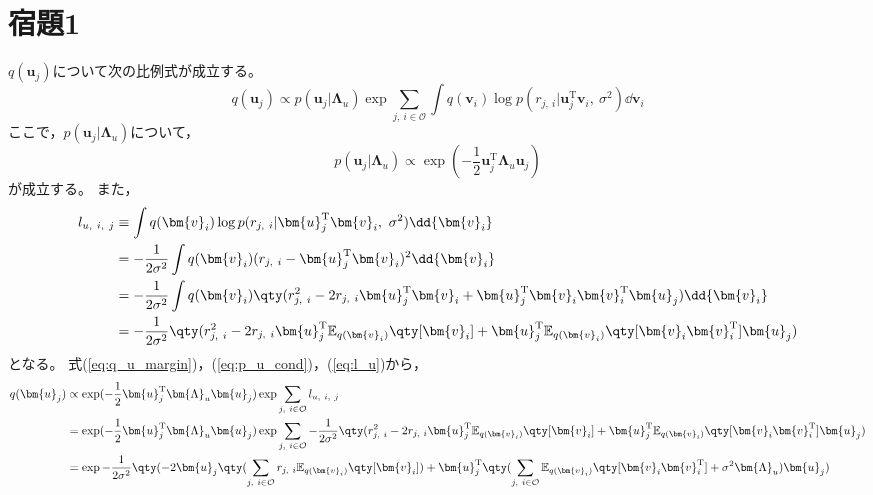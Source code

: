 \documentclass[class=jsarticle, crop=false, dvipdfmx, fleqn]{standalone}
\begin{document}
\section*{宿題1}

\(q(\bm{u}_j)\)について次の比例式が成立する。
\begin{equation}
    q(\bm{u}_j) \propto p(\bm{u}_j | \bm{\Lambda}_u) \exp{\sum_{j,\ i \in \mathcal{O}} \int q(\bm{v}_i) \log{p(r_{j,\ i} | \bm{u}_j^\mathrm{T} \bm{v}_i,\ \sigma^2)} \dd{\bm{v}_i}}
    \label{eq:q_u_margin}
\end{equation}
ここで，\(p(\bm{u}_j | \bm{\Lambda}_u)\)について，
\begin{equation}
    p(\bm{u}_j | \bm{\Lambda}_u) \propto \exp(- \frac{1}{2} \bm{u}_j^\mathrm{T} \bm{\Lambda}_u \bm{u}_j)
    \label{eq:p_u_cond}
\end{equation}
が成立する。
また，
\begin{align}
    l_{u,\ i,\ j}
        & \equiv \int q(\bm{v}_i) \log{p(r_{j,\ i} | \bm{u}_j^\mathrm{T} \bm{v}_i,\ \sigma^2)} \dd{\bm{v}_i} \\
        & = - \frac{1}{2 \sigma^2} \int q(\bm{v}_i) (r_{j,\ i} - \bm{u}_j^\mathrm{T} \bm{v}_i)^2 \dd{\bm{v}_i} \notag \\
        & = - \frac{1}{2 \sigma^2} \int q(\bm{v}_i) \qty(r_{j,\ i}^2 - 2 r_{j,\ i} \bm{u}_j^\mathrm{T} \bm{v}_i + \bm{u}_j^\mathrm{T} \bm{v}_i \bm{v}_i^\mathrm{T} \bm{u}_j) \dd{\bm{v}_i} \notag \\
        & = - \frac{1}{2 \sigma^2} \qty(r_{j,\ i}^2 - 2 r_{j,\ i} \bm{u}_j^\mathrm{T} \mathbb{E}_{q(\bm{v}_i)} \qty[\bm{v}_i] + \bm{u}_j^\mathrm{T} \mathbb{E}_{q(\bm{v}_i)} \qty[\bm{v}_i \bm{v}_i^\mathrm{T}] \bm{u}_j)
        \label{eq:l_u}
\end{align}
となる。
式(\ref{eq:q_u_margin})，(\ref{eq:p_u_cond})，(\ref{eq:l_u})から，
\begin{align}
    q(\bm{u}_j)
        & \propto \exp(- \frac{1}{2} \bm{u}_j^\mathrm{T} \bm{\Lambda}_u \bm{u}_j) \exp{\sum_{j,\ i \in \mathcal{O}} l_{u,\ i,\ j}} \notag \\
        & = \exp(- \frac{1}{2} \bm{u}_j^\mathrm{T} \bm{\Lambda}_u \bm{u}_j) \exp{\sum_{j,\ i \in \mathcal{O}} - \frac{1}{2 \sigma^2} \qty(r_{j,\ i}^2 - 2 r_{j,\ i} \bm{u}_j^\mathrm{T} \mathbb{E}_{q(\bm{v}_i)} \qty[\bm{v}_i] + \bm{u}_j^\mathrm{T} \mathbb{E}_{q(\bm{v}_i)} \qty[\bm{v}_i \bm{v}_i^\mathrm{T}] \bm{u}_j)} \notag \\
        & = \exp{- \frac{1}{2 \sigma^2} \qty(-2\bm{u}_j \qty(\sum_{j,\ i \in \mathcal{O}} r_{j,\ i} \mathbb{E}_{q(\bm{v}_i)} \qty[\bm{v}_i]) + \bm{u}_j^\mathrm{T} \qty(\sum_{j,\ i \in \mathcal{O}} \mathbb{E}_{q(\bm{v}_i)} \qty[\bm{v}_i \bm{v}_i^\mathrm{T}] + \sigma^2 \bm{\Lambda}_u) \bm{u}_j)}
        \label{eq:q_u}
\end{align}
\end{document}
